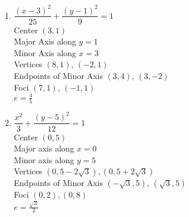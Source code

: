 \begin{multicols}{2}
\begin{enumerate}
\setcounter{enumi}{\value{HW}}

\item  $\dfrac{(x-3)^2}{25} + \dfrac{\left(y-1\right)^2}{9} = 1$\\
Center  $\left(3, 1 \right)$\\
Major Axis along $y=1$\\
Minor Axis along $x=3$\\
Vertices  $\left( 8, 1   \right)$, $(-2, 1)$\\
Endpoints of Minor Axis $\left(3,4\right)$, $\left(3,-2\right)$\\
Foci $\left(7,1 \right)$, $\left(-1, 1\right)$\\
$e = \frac{4}{5}$


\vfill

\columnbreak


\item $\dfrac{x^{2}}{3} + \dfrac{(y - 5)^{2}}{12} = 1$\\
Center $(0, 5)$\\
Major axis along $x = 0$\\
Minor axis along $y = 5$\\
Vertices $(0, 5 - 2\sqrt{3}), (0, 5 + 2\sqrt{3})$\\
Endpoints of Minor Axis $(-\sqrt{3},5)$, $(\sqrt{3},5)$\\
Foci $(0, 2), (0, 8)$\\
$e = \frac{\sqrt{3}}{2}$


\setcounter{HW}{\value{enumi}}
\end{enumerate}
\end{multicols}

